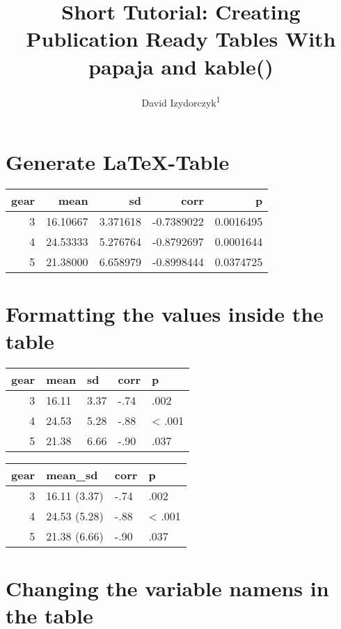 \documentclass[
  english,
  man,floatsintext]{apa6}
\title{Short Tutorial: Creating Publication Ready Tables With papaja and kable()}
\author{David Izydorczyk\textsuperscript{1}}
\date{}
\affiliation{\vspace{0.5cm}\textsuperscript{1} }
\begin{document}
\maketitle

\hypertarget{generate-latex-table}{%
\section{Generate LaTeX-Table}\label{generate-latex-table}}

\begin{tabular}{rrrrr}
\toprule
gear & mean & sd & corr & p\\
\midrule
3 & 16.10667 & 3.371618 & -0.7389022 & 0.0016495\\
4 & 24.53333 & 5.276764 & -0.8792697 & 0.0001644\\
5 & 21.38000 & 6.658979 & -0.8998444 & 0.0374725\\
\bottomrule
\end{tabular}

\hypertarget{formatting-the-values-inside-the-table}{%
\section{Formatting the values inside the table}\label{formatting-the-values-inside-the-table}}

\begin{tabular}{rllll}
\toprule
gear & mean & sd & corr & p\\
\midrule
3 & 16.11 & 3.37 & -.74 & .002\\
4 & 24.53 & 5.28 & -.88 & < .001\\
5 & 21.38 & 6.66 & -.90 & .037\\
\bottomrule
\end{tabular}

\begin{tabular}{rlll}
\toprule
gear & mean\_sd & corr & p\\
\midrule
3 & 16.11 (3.37) & -.74 & .002\\
4 & 24.53 (5.28) & -.88 & < .001\\
5 & 21.38 (6.66) & -.90 & .037\\
\bottomrule
\end{tabular}

\newpage

\hypertarget{changing-the-variable-namens-in-the-table}{%
\section{Changing the variable namens in the table}\label{changing-the-variable-namens-in-the-table}}
\end{document}
